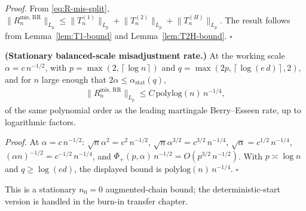 \textit{Proof.} From \eqref{eq:R-mis-split},
\(\lVert  R_n^{\text{mis, RR}}  \rVert_{L_p} \le \lVert  T_n^{(1)}  \rVert_{L_p} + \lVert  T_n^{(2)}  \rVert_{L_p} + \lVert  T_n^{(H)}  \rVert_{L_p}\).
The result follows from Lemma~\ref{lem:T1-bound} and Lemma~\ref{lem:T2H-bound}. \(\square\)

\begin{corollary}\label{cor:misadjustment-rate}
  \textbf{(Stationary balanced-scale misadjustment rate.)}
  At the working scale \(\alpha = c \, n^{-1 / 2}\), with
  \(p = \max(2, \left\lceil \log n \right\rceil)\) and \(q = \max(2 p, \left\lceil \log(e \, d) \right\rceil, 2)\), and for \(n\)
  large enough that \(2 \alpha \le \alpha_{\text{stat}}(q)\),
\begin{equation}
\begin{aligned}
\lVert  R_n^{\text{mis, RR}}  \rVert_{L_p} \le C \, \text{polylog}(n) \, n^{-1 / 4},
\end{aligned}
\end{equation}
  of the same polynomial order as the leading martingale Berry--Esseen rate,
  up to logarithmic factors.
\end{corollary}

\textit{Proof.} At \(\alpha = c \, n^{-1 / 2}\): \(\sqrt{n} \alpha^2 = c^2 \, n^{-1 / 2}\),
\(\sqrt{n} \alpha^{3 / 2} = c^{3 / 2} \, n^{-1 / 4}\),
\(\sqrt{\alpha} = c^{1 / 2} \, n^{-1 / 4}\),
\((\alpha n)^{-1 / 2} = c^{-1 / 2} \, n^{-1 / 4}\), and
\(\Phi_+(p, \alpha) \, n^{-1 / 2} = O(p^{3 / 2} \, n^{-1 / 2})\).
With \(p \asymp \log n\) and \(q \ge \log(e d)\), the displayed bound is
\(\text{polylog}(n) \, n^{-1 / 4}\). \(\square\)

This is a stationary \(n_0 = 0\) augmented-chain bound; the deterministic-start
version is handled in the burn-in transfer chapter.

